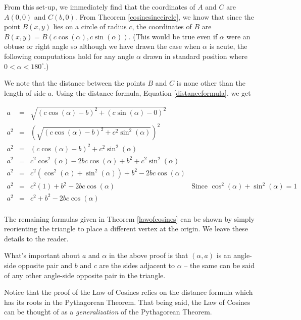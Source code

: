 \documentclass{ximera}
\begin{document}
From this set-up, we immediately find that the coordinates of $A$ and $C$ are $A(0,0)$ and $C(b,0)$.  From Theorem \ref{cosinesinecircle}, we know that since the point $B(x,y)$ lies on a circle of radius $c$, the coordinates of $B$ are $B(x,y) = B(c \cos(\alpha), c \sin(\alpha))$.  (This would be true even if $\alpha$ were an obtuse or right angle so although we have drawn the case when $\alpha$ is acute, the following computations hold for any angle $\alpha$ drawn in standard position where $0 < \alpha < 180^{\circ}$.) 

\smallskip

 We note that the distance between the points $B$ and $C$ is none other than the length of side $a$.  Using the distance formula, Equation \ref{distanceformula}, we get

\[\begin{array}{rclr}
a & = & \sqrt{(c \cos(\alpha) - b)^{2} + (c \sin(\alpha) - 0)^2} & \\ [3pt]
a^{2} & = & \left(\sqrt{(c \cos(\alpha) - b)^{2} + c^2 \sin^2(\alpha)}\right)^2 & \\  [3pt]
a^2 & = &  (c \cos(\alpha) - b)^{2} + c^2 \sin^2(\alpha) & \\  [3pt]
a^2 & = & c^2 \cos^2(\alpha) - 2bc \cos(\alpha) + b^2 + c^2 \sin^2(\alpha) & \\  [3pt]
a^2 & = & c^2\left(\cos^2(\alpha) + \sin^2(\alpha)\right) + b^2 - 2bc \cos(\alpha) & \\  [3pt]
a^2 & = & c^2(1) + b^2 - 2bc \cos(\alpha) & \text{Since $\cos^2(\alpha) + \sin^2(\alpha) = 1$}\\  [3pt]
a^2 & = & c^2 + b^2 - 2bc \cos(\alpha) & \\
\end{array} \]

The remaining formulas given in Theorem \ref{lawofcosines} can be shown by simply reorienting the triangle to place a different vertex at the origin.  We leave these details to the reader.  

\smallskip

What's important about $a$ and $\alpha$ in the above proof is that $(\alpha,a)$ is an angle-side opposite pair and $b$ and $c$ are the sides adjacent to $\alpha$ -- the same can be said of any other angle-side opposite pair in the triangle.   

\smallskip

Notice that the proof of the Law of Cosines relies on the distance formula which has its roots in the Pythagorean Theorem.  That being said, the Law of Cosines can be thought of as a \textit{generalization} of the Pythagorean Theorem. 
\end{document}
